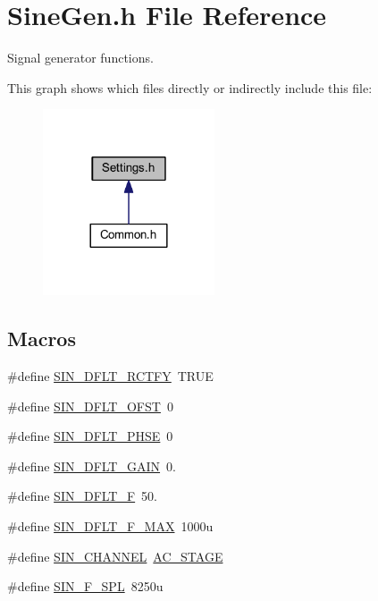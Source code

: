 \hypertarget{a00032}{\section{Sine\-Gen.\-h File Reference}
\label{a00032}
}


Signal generator functions.  


This graph shows which files directly or indirectly include this file\-:
\nopagebreak
\begin{figure}[H]
\begin{center}
\leavevmode
\includegraphics[width=144pt]{a00055}
\end{center}
\end{figure}
\subsection*{Macros}
\begin{DoxyCompactItemize}
\item 
\#define \hyperlink{a00032_afc105af9d8f851266d0b8e8ffe57931a}{S\-I\-N\-\_\-\-D\-F\-L\-T\-\_\-\-R\-C\-T\-F\-Y}~T\-R\-U\-E
\item 
\#define \hyperlink{a00032_a9c042423a04dc371b1c79ecc1f16e813}{S\-I\-N\-\_\-\-D\-F\-L\-T\-\_\-\-O\-F\-S\-T}~0
\item 
\#define \hyperlink{a00032_ae88ab3e38bc960b4c0e15f9712d25f72}{S\-I\-N\-\_\-\-D\-F\-L\-T\-\_\-\-P\-H\-S\-E}~0
\item 
\#define \hyperlink{a00032_aa63a6918009b4e4381e359cee2f05eef}{S\-I\-N\-\_\-\-D\-F\-L\-T\-\_\-\-G\-A\-I\-N}~0.
\item 
\#define \hyperlink{a00032_aa1d98c477c6de604fc6ca986f2d83238}{S\-I\-N\-\_\-\-D\-F\-L\-T\-\_\-\-F}~50.
\item 
\#define \hyperlink{a00032_a1640e33dcd5a970b4a9731ec68125bd6}{S\-I\-N\-\_\-\-D\-F\-L\-T\-\_\-\-F\-\_\-\-M\-A\-X}~1000u
\item 
\#define \hyperlink{a00032_a71b6211a4d077af219d7e503f17114d1}{S\-I\-N\-\_\-\-C\-H\-A\-N\-N\-E\-L}~\hyperlink{a00020_a3fc4318ae73eae35339f616047300b0f}{A\-C\-\_\-\-S\-T\-A\-G\-E}
\item 
\#define \hyperlink{a00032_a8d1689d7437a3410059f1f377ec63ebd}{S\-I\-N\-\_\-\-F\-\_\-\-S\-P\-L}~8250u
\end{DoxyCompactItemize}
